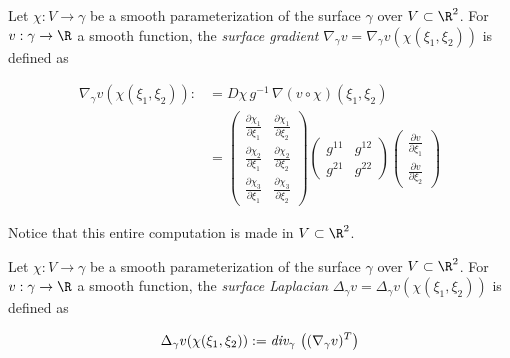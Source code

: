 \documentclass[10pt]{article}
\begin{document}
\begin{definition} Let $\chi : V \to \gamma$ be
   a smooth parameterization of the surface $\gamma$ over $V \subset \R^2$. For
   $v : \gamma \to \R$  a smooth function, the 
   \emph{surface gradient} $\nabla_{\gamma} v = \nabla_\gamma
   v(\chi(\xi_1,\xi_2))$ is defined as 

   \begin{align}
      \nabla_\gamma v(\chi(\xi_1,\xi_2)) 
      :&= D\chi \, g^{-1} \,\nabla (v \circ \chi)(\xi_1,\xi_2) \\
      &= \left( 
         \begin{array}{cc}
           \frac{\partial \chi_1}{\partial \xi_1} &  \frac{\partial \chi_1}{\partial \xi_2} \\ 
           \frac{\partial \chi_2}{\partial \xi_1} &  \frac{\partial \chi_2}{\partial \xi_2} \\ 
           \frac{\partial \chi_3}{\partial \xi_1} &  \frac{\partial \chi_3}{\partial \xi_2} 
         \end{array} \right)
         \left(
         \begin{array}{cc}    
            g^{11} & g^{12} \\
            g^{21} & g^{22} 
         \end{array} \right)
         \left(
         \begin{array}{c}    
            \frac{\partial v}{\partial \xi_1} \\
            \frac{\partial v}{\partial \xi_2}
         \end{array} \right)
      \label{eqn:surface_grad}
   \end{align}

   Notice that this entire computation is made in $V \subset \R^2$.  
   
\end{definition}


\begin{definition}
   
\end{definition}

\begin{definition} Let $\chi : V \to \gamma$ be
   a smooth parameterization of the surface $\gamma$ over $V \subset \R^2$. For
   $v : \gamma \to \R$  a smooth function, the 
   \emph{surface Laplacian} $\Delta_{\gamma} v = \Delta_\gamma v(\chi(\xi_1,\xi_2))$ is defined as 

   \begin{equation}
      \Delta_\gamma v(\chi(\xi_1,\xi_2)) := \emph{div}_{\gamma}\, \left( (\nabla_\gamma
      v)^T \right)
      \label{eqn:surface_laplacian}
   \end{equation}
   
\end{definition}
\end{document}
